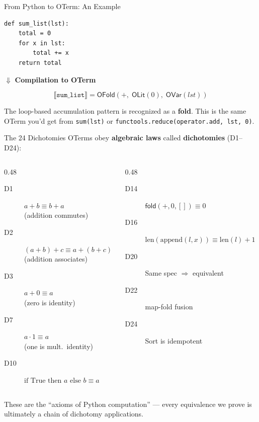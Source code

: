 \documentclass[aspectratio=169,11pt]{beamer}
\newcommand{\den}[1]{\llbracket #1 \rrbracket}
\begin{document}
\begin{frame}[fragile]{From Python to OTerm: An Example}
\begin{lstlisting}[language=deppy]
def sum_list(lst):
    total = 0
    for x in lst:
        total += x
    return total
\end{lstlisting}

\vspace{0.5em}
$\Downarrow$ \textbf{Compilation to OTerm}

\[
  \den{\mathtt{sum\_list}} = \mathsf{OFold}(+,\; \mathsf{OLit}(0),\; \mathsf{OVar}(\mathit{lst}))
\]

\vspace{0.5em}
The loop-based accumulation pattern is recognized as a \textbf{fold}.
This is the same OTerm you'd get from \texttt{sum(lst)} or
\texttt{functools.reduce(operator.add, lst, 0)}.
\end{frame}

\begin{frame}{The 24 Dichotomies}
OTerms obey \textbf{algebraic laws} called \textbf{dichotomies} (D1--D24):

\vspace{0.5em}
\begin{columns}
\begin{column}{0.48\textwidth}
\begin{description}
\item[D1] $a + b \equiv b + a$ \\ (addition commutes)
\item[D2] $(a + b) + c \equiv a + (b + c)$ \\ (addition associates)
\item[D3] $a + 0 \equiv a$ \\ (zero is identity)
\item[D7] $a \cdot 1 \equiv a$ \\ (one is mult.\ identity)
\item[D10] $\text{if True then } a \text{ else } b \equiv a$
\end{description}
\end{column}
\begin{column}{0.48\textwidth}
\begin{description}
\item[D14] $\mathsf{fold}(+, 0, []) \equiv 0$
\item[D16] $\text{len}(\text{append}(l,x)) \equiv \text{len}(l) + 1$
\item[D20] Same spec $\Rightarrow$ equivalent
\item[D22] map-fold fusion
\item[D24] Sort is idempotent
\end{description}
\end{column}
\end{columns}

\vspace{0.5em}
These are the ``axioms of Python computation'' --- every equivalence
we prove is ultimately a chain of dichotomy applications.
\end{frame}
\end{document}
